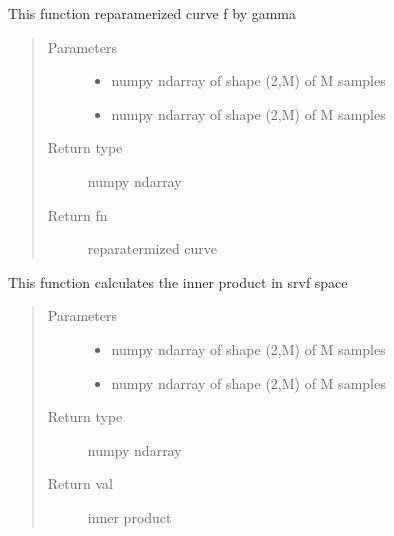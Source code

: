 \documentclass[letterpaper,10pt,english]{sphinxmanual}
\begin{document}
\begin{fulllineitems}
\label{\detokenize{curve_functions:curve_functions.group_action_by_gamma_coord}}
This function reparamerized curve f by gamma
\begin{quote}\begin{description}
\item[{Parameters}] \leavevmode\begin{itemize}
\item {} 
 \textendash{} numpy ndarray of shape (2,M) of M samples

\item {} 
 \textendash{} numpy ndarray of shape (2,M) of M samples

\end{itemize}

\item[{Return type}] \leavevmode
numpy ndarray

\item[{Return fn}] \leavevmode
reparatermized curve

\end{description}\end{quote}

\end{fulllineitems}


\begin{fulllineitems}
\label{\detokenize{curve_functions:curve_functions.innerprod_q2}}
This function calculates the inner product in srvf space
\begin{quote}\begin{description}
\item[{Parameters}] \leavevmode\begin{itemize}
\item {} 
 \textendash{} numpy ndarray of shape (2,M) of M samples

\item {} 
 \textendash{} numpy ndarray of shape (2,M) of M samples

\end{itemize}

\item[{Return type}] \leavevmode
numpy ndarray

\item[{Return val}] \leavevmode
inner product

\end{description}\end{quote}

\end{fulllineitems}
\end{document}
